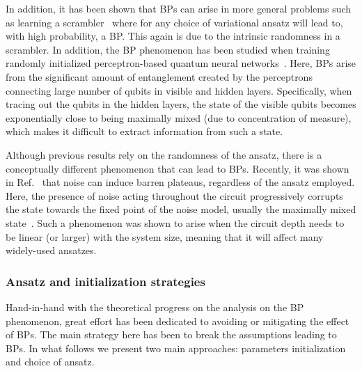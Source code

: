 \documentclass[prx,twocolumn,floatfix,superscriptaddress,longbibliography]{revtex4-1}
\newcommand{\<}{\langle}
\renewcommand{\>}{\rangle}
\begin{document}
In addition, it has been shown that BPs can arise in more general problems such as learning a scrambler~\cite{holmes2020barren} where for any choice of variational ansatz will lead to, with high probability, a BP. This again is due to the intrinsic randomness in a scrambler. In addition, the BP phenomenon has been studied when training randomly initialized  perceptron-based quantum neural  networks~\cite{sharma2020trainability,marrero2020entanglement}. Here, BPs arise from the significant amount of entanglement created by the perceptrons connecting large number of qubits in visible and hidden layers. Specifically, when tracing out the qubits in the hidden layers, the state of the visible qubits becomes exponentially close to being maximally mixed (due to concentration of measure), which makes it difficult to extract information from such a state. 

Although previous results rely on the randomness of the ansatz, there is a conceptually different phenomenon that can lead to BPs. Recently, it was shown in Ref.~\cite{wang2020noise} that noise can induce barren plateaus, regardless of the ansatz employed. Here, the presence of noise acting throughout the circuit progressively corrupts the state towards the fixed point of the noise model, usually the maximally mixed state~\cite{franca2020limitations}.  Such a phenomenon was shown to arise when the circuit depth needs to be linear (or larger) with the system size, meaning that it will affect many widely-used ansatzes. 



\subsubsection{ Ansatz and initialization strategies}

Hand-in-hand with the theoretical progress on the analysis on the BP phenomenon, great effort has been dedicated to avoiding or mitigating the effect of BPs. The main strategy here has been to break the assumptions leading to BPs. In what follows we present two main approaches: parameters initialization and  choice of ansatz. 
\end{document}
